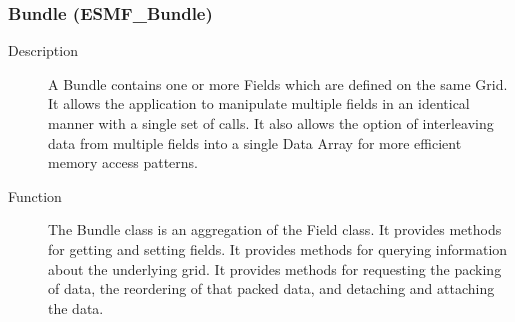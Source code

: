 

\subsubsection{Bundle (ESMF\_Bundle)}
\label{sec:bundle} 
\begin{description}
\item [Description] A Bundle contains one or more Fields which are defined on the
same Grid.  It allows the application to manipulate multiple fields in an identical
manner with a single set of calls.  It also allows the option of interleaving data
from multiple fields into a single Data Array for more efficient memory access patterns.
\item [Function] The Bundle class is an aggregation of the Field class.  It provides methods 
for getting and setting fields.  It provides methods for querying information about the
underlying grid.  It provides methods for requesting the packing of data, the
reordering of that packed data, and detaching and attaching the data.
\end{description}



